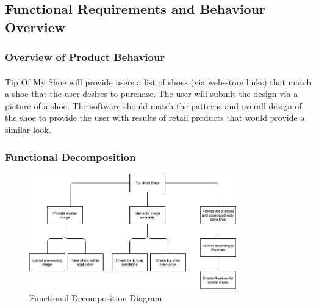 \documentclass[12pt, titlepage]{article}
\begin{document}
\subsection{Functional Requirements and Behaviour Overview}

\subsubsection{Overview of Product Behaviour}
\paragraph{} Tip Of My Shoe will provide users a list of shoes (via web-store links) that match a shoe that the user desires to purchase. The user will submit the design via a picture of a shoe. The software should match the patterns and overall design of the shoe to provide the user with results of retail products that would provide a similar look.


\subsubsection{Functional Decomposition}

\begin{figure}[H]
  \centering
    \includegraphics[width=0.8\textwidth]{images/TOMS.png}
    \caption{Functional Decomposition Diagram}
\end{figure}
\end{document}
